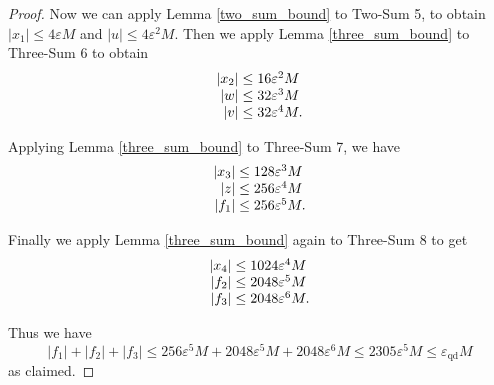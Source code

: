 \documentclass[11pt]{article}
\theoremstyle{definition}
\newcommand{\eps}{\varepsilon}
\newcommand{\epsqd}{\varepsilon_\mathrm{qd}}
\begin{document}
\begin{proof}
Now we can apply Lemma \ref{two_sum_bound} to {\sc Two-Sum} 5, to obtain
$|x_1| \le 4\eps M$ and $|u| \le 4 \eps^2 M$.  Then we apply Lemma 
\ref{three_sum_bound} to {\sc Three-Sum} 6 to obtain
\begin{displaymath}
  \begin{array}{r@{\;\le\;}l}
    |x_2| & 16\eps^2 M \\
    |w| & 32 \eps^3 M  \\
    |v| & 32 \eps^4 M.
  \end{array}
\end{displaymath}

Applying Lemma \ref{three_sum_bound} to {\sc Three-Sum} 7, we have
\begin{displaymath}
  \begin{array}{r@{\;\le\;}l}
    |x_3| & 128\eps^3 M \\
    |z| & 256 \eps^4 M  \\
    |f_1| & 256 \eps^5 M.
  \end{array}
\end{displaymath}

Finally we apply Lemma \ref{three_sum_bound} again to {\sc Three-Sum} 8
to get
\begin{displaymath}
  \begin{array}{r@{\;\le\;}l}
    |x_4| & 1024\eps^4 M \\
    |f_2| & 2048 \eps^5 M  \\
    |f_3| & 2048 \eps^6 M.
  \end{array}
\end{displaymath}

Thus we have 
\begin{displaymath}
  |f_1| + |f_2| + |f_3| \le 256 \eps^5 M + 2048 \eps^5 M + 2048 \eps^6 M 
  \le 2305 \eps^5 M \le \epsqd M
\end{displaymath}
as claimed.
\end{proof}

\newpage


\end{document}
